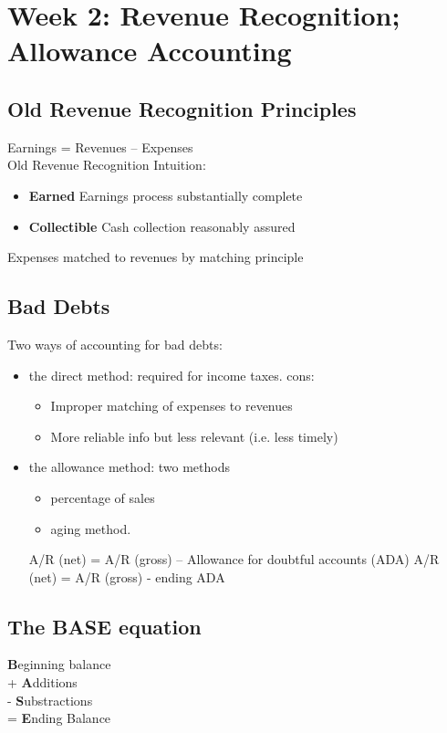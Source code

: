 \section*{Week 2: Revenue Recognition; Allowance Accounting}

\subsection*{Old Revenue Recognition Principles}
Earnings = Revenues – Expenses \\
Old Revenue Recognition Intuition:
\begin{itemize}
	\item \textbf{Earned} Earnings process substantially complete
	\item \textbf{Collectible} Cash collection reasonably assured
\end{itemize}
Expenses matched to revenues by matching principle


\subsection*{Bad Debts}

Two ways of accounting for bad debts:
\begin{itemize}
	\item the direct method: required for income taxes. cons: 
	\begin{itemize}
		\item Improper matching of expenses to revenues
		\item More reliable info but less relevant (i.e. less timely)
	\end{itemize}
	\item the allowance method: two methods
	\begin{itemize}
		\item percentage of sales
		\item aging method.
	\end{itemize}

A/R (net) = A/R (gross) – Allowance for doubtful accounts (ADA)
A/R (net) = A/R (gross) - ending ADA
	
\end{itemize}

\subsection*{The BASE equation}

\textbf{B}eginning balance\\
+ \textbf{A}dditions \\
- \textbf{S}ubstractions \\
= \textbf{E}nding Balance

